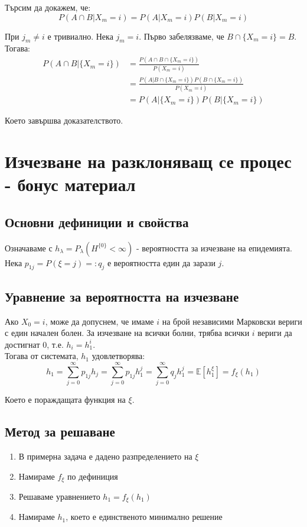 \documentclass{article}
\begin{document}
Търсим да докажем, че:
$$P(A \cap B | X_m = i) = P(A | X_m = i)P(B | X_m = i)$$

При $j_m\neq i$ е тривиално. Нека $j_m=i$.
Първо забелязваме, че $B \cap \{X_m = i\} = B$. Тогава:
\begin{align*}
P(A \cap B | \{X_m = i\}) &= \frac{P(A \cap B \cap \{X_m = i\})}{P(X_m = i)} \\
&= \frac{P(A | B \cap \{X_m = i\})P(B \cap \{X_m = i\})}{P(X_m = i)} \\
&= P(A | \{X_m = i\})P(B | \{X_m = i\})
\end{align*}

Което завършва доказателството.

\section{Изчезване на разклоняващ се процес - бонус материал}
\subsection{Основни дефиниции и свойства}
Означаваме с $h_\lambda = P_\lambda(H^{\{0\}} < \infty)$ - вероятността за изчезване на епидемията. \\ 
Нека $p_{1j} = P(\xi = j) =: q_j$ е вероятността един да зарази $j$.

\subsection{Уравнение за вероятността на изчезване}

Ако $X_0 = i$, може да допуснем, че имаме $i$ на брой независими Марковски вериги с един начален болен. 
За изчезване на всички болни, трябва всички $i$ вериги да достигнат 0, т.е. $h_i = h_1^i$. \\

Тогава от системата, $h_1$ удовлетворява:
$$ h_1 = \sum_{j=0}^\infty p_{1j} h_j = \sum_{j=0}^\infty p_{1j} h_1^j = \sum_{j=0}^\infty q_j h_1^j = \mathbb{E}[h_1^\xi]= f_\xi(h_1)$$

Което е пораждащата функция на $\xi$.

\subsection{Метод за решаване}
\begin{enumerate}
\item В примерна задача е дадено разпределението на $\xi$
\item Намираме $f_\xi$ по дефиниция
\item Решаваме уравнението $h_1 = f_\xi(h_1)$
\item Намираме $h_1$, което е единственото минимално решение
\end{enumerate}
\end{document}
